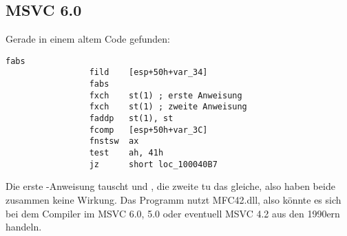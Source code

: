 \subsection{MSVC 6.0}

Gerade in einem altem Code gefunden:

\begin{lstlisting}[style=customasmx86]
                 fabs
                 fild    [esp+50h+var_34]
                 fabs
                 fxch    st(1) ; erste Anweisung
                 fxch    st(1) ; zweite Anweisung
                 faddp   st(1), st
                 fcomp   [esp+50h+var_3C]
                 fnstsw  ax
                 test    ah, 41h
                 jz      short loc_100040B7
\end{lstlisting}

Die erste -Anweisung tauscht  und , die zweite tu das
gleiche, also haben beide zusammen keine Wirkung.
Das Programm nutzt MFC42.dll, also könnte es sich bei dem Compiler im MSVC 6.0, 5.0
oder eventuell MSVC 4.2 aus den 1990ern handeln.
